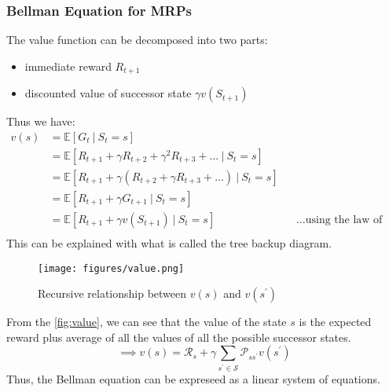 \subsubsection{Bellman Equation for MRPs}
The value function can be decomposed into two parts:
\begin{itemize}
    \item immediate reward \(R_{t+1}\)
    \item discounted value of successor state \(\gamma v(S_{t+1})\)
\end{itemize}
Thus we have:
\[
    \begin{aligned}
        v(s) & = \mathbb{E}  [ G_{t} \ |\  S_{t} = s] \\
             & = \mathbb{E}  [ R_{t+1} + \gamma R_{t+2} + \gamma^{2} R_{t+3} + \dots \ |\  S_{t} = s] \\
             & = \mathbb{E}  [ R_{t+1} + \gamma (R_{t+2} + \gamma R_{t+3} + \dots) \ |\  S_{t} = s] \\
             & = \mathbb{E}  [ R_{t+1} + \gamma G_{t+1} \ |\  S_{t} = s] \\
             & = \mathbb{E}  [ R_{t+1} + \gamma v(S_{t+1}) \ |\  S_{t} = s] &&\dots \text{using the law of iterated expectations} \\ 
    \end{aligned}
\]
This can be explained with what is called the tree backup diagram.
\begin{figure}[H]
    \centering
    \texttt{[image: figures/value.png]}
    \caption{Recursive relationship between \(v(s)\) and \(v(s^{\prime} )\)}
    \label{fig:value}
\end{figure}
From the \autoref{fig:value}, we can see that the value of the state \(s\) is the
expected reward plus average of all the values of all the possible successor states.
\[
    \implies v(s) = \mathcal{R} _{s} + \gamma \sum_{s^{\prime} \in \mathcal{S} } \mathcal{P} _{ss^{\prime}} v(s^{\prime})
\]
Thus, the Bellman equation can be expreseed as a linear system of equations.
